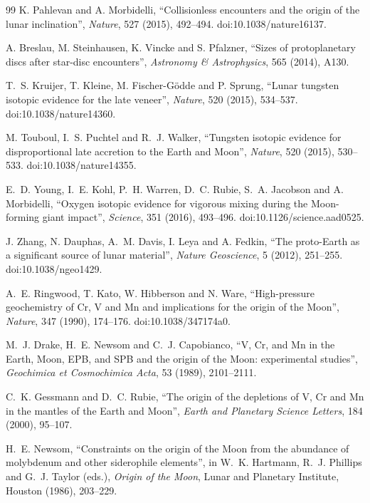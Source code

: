 \documentclass[11pt,a4paper,openany]{report}
\begin{document}
\begin{thebibliography}{99}
 K. Pahlevan and A. Morbidelli, ``Collisionless encounters and the
origin of the lunar inclination'', \emph{Nature}, 527 (2015), 492--494. doi:10.1038/nature16137.

 A. Breslau, M. Steinhausen, K. Vincke and S. Pfalzner, ``Sizes of
protoplanetary discs after star-disc encounters'', \emph{Astronomy \& Astrophysics}, 565 (2014),
A130.

 T.~S. Kruijer, T. Kleine, M. Fischer-Gödde and P. Sprung, ``Lunar tungsten
isotopic evidence for the late veneer'', \emph{Nature}, 520 (2015), 534--537.
doi:10.1038/nature14360.

 M. Touboul, I.~S. Puchtel and R.~J. Walker, ``Tungsten isotopic evidence for
disproportional late accretion to the Earth and Moon'', \emph{Nature}, 520 (2015), 530--533.
doi:10.1038/nature14355.

 E.~D. Young, I.~E. Kohl, P.~H. Warren, D.~C. Rubie, S.~A. Jacobson and
A. Morbidelli, ``Oxygen isotopic evidence for vigorous mixing during the Moon-forming giant
impact'', \emph{Science}, 351 (2016), 493--496. doi:10.1126/science.aad0525.

 J. Zhang, N. Dauphas, A.~M. Davis, I. Leya and A. Fedkin, ``The proto-Earth as
a significant source of lunar material'', \emph{Nature Geoscience}, 5 (2012), 251--255.
doi:10.1038/ngeo1429.

 A.~E. Ringwood, T. Kato, W. Hibberson and N. Ware, ``High-pressure
geochemistry of Cr, V and Mn and implications for the origin of the Moon'', \emph{Nature}, 347
(1990), 174--176. doi:10.1038/347174a0.

 M.~J. Drake, H.~E. Newsom and C.~J. Capobianco, ``V, Cr, and Mn in the Earth,
Moon, EPB, and SPB and the origin of the Moon: experimental studies'', \emph{Geochimica et
Cosmochimica Acta}, 53 (1989), 2101--2111.

 C.~K. Gessmann and D.~C. Rubie, ``The origin of the depletions of V,
Cr and Mn in the mantles of the Earth and Moon'', \emph{Earth and Planetary Science Letters}, 184
(2000), 95--107.

 H.~E. Newsom, ``Constraints on the origin of the Moon from the abundance of
molybdenum and other siderophile elements'', in W.~K. Hartmann, R.~J. Phillips and G.~J. Taylor
(eds.), \emph{Origin of the Moon}, Lunar and Planetary Institute, Houston (1986), 203--229.


\end{thebibliography}
\end{document}
